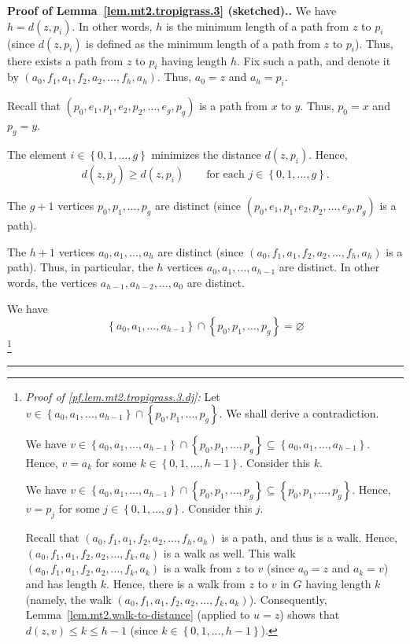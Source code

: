 \documentclass[numbers=enddot,12pt,final,onecolumn,notitlepage]{scrartcl}%
\theoremstyle{definition}
\newenvironment{proof}[1][Proof]{\noindent\textbf{#1.} }{\ \rule{0.5em}{0.5em}}
\newcommand{\set}[1]{\left\{ #1 \right\}}
\newcommand{\tup}[1]{\left( #1 \right)}
\begin{document}
\begin{proof}[Proof of Lemma~\ref{lem.mt2.tropigrass.3} (sketched).]
We have $h = d \tup{z, p_i}$.
In other words, $h$ is the minimum length of a path from $z$
to $p_i$ (since $d \tup{z, p_i}$ is defined as
the minimum length of a path from $z$ to $p_i$).
Thus, there exists a path from $z$ to $p_i$ having length $h$.
Fix such a path, and denote it by
$\tup{a_0, f_1, a_1, f_2, a_2, \ldots, f_h, a_h}$.
Thus, $a_0 = z$ and $a_h = p_i$.

Recall that $\tup{p_0, e_1, p_1, e_2, p_2, \ldots, e_g, p_g}$
is a path from $x$ to $y$.
Thus, $p_0 = x$ and $p_g = y$.

The element $i \in \set{0, 1, \ldots, g}$ minimizes the
distance $d \tup{z, p_i}$. Hence,
\begin{equation}
d \tup{z, p_j} \geq d \tup{z, p_i}
\qquad \text{for each } j \in \set{0, 1, \ldots, g} .
\label{pf.lem.mt2.tropigrass.3.min}
\end{equation}

The $g+1$ vertices $p_0, p_1, \ldots, p_g$ are
distinct
(since $\tup{p_0, e_1, p_1, e_2, p_2, \ldots, e_g, p_g}$ is a
path).

The $h+1$ vertices $a_0, a_1, \ldots, a_h$
are distinct
(since $\tup{a_0, f_1, a_1, f_2, a_2, \ldots, f_h, a_h}$
is a path).
Thus, in particular, the $h$ vertices
$a_0, a_1, \ldots, a_{h-1}$ are distinct.
In other words, the vertices $a_{h-1}, a_{h-2}, \ldots, a_0$ are
distinct.

We have
\begin{equation}
\set{a_0, a_1, \ldots, a_{h-1}} \cap \set{p_0, p_1, \ldots, p_g}
= \varnothing
\label{pf.lem.mt2.tropigrass.3.dj}
\end{equation}
\footnote{\textit{Proof of \eqref{pf.lem.mt2.tropigrass.3.dj}:}
    Let $v \in
    \set{a_0, a_1, \ldots, a_{h-1}} \cap \set{p_0, p_1, \ldots, p_g}$.
    We shall derive a contradiction.

    We have
    $v \in
    \set{a_0, a_1, \ldots, a_{h-1}} \cap \set{p_0, p_1, \ldots, p_g}
    \subseteq \set{a_0, a_1, \ldots, a_{h-1}}$. Hence,
    $v = a_k$ for some $k \in \set{0, 1, \ldots, h-1}$. Consider this
    $k$.

    We have $v \in
    \set{a_0, a_1, \ldots, a_{h-1}} \cap \set{p_0, p_1, \ldots, p_g}
    \subseteq \set{p_0, p_1, \ldots, p_g}$. Hence,
    $v = p_j$ for some $j \in \set{0, 1, \ldots, g}$. Consider this
    $j$. 

    Recall that $\tup{a_0, f_1, a_1, f_2, a_2, \ldots, f_h, a_h}$
    is a path, and thus is a walk. Hence,
    $\tup{a_0, f_1, a_1, f_2, a_2, \ldots, f_k, a_k}$
    is a walk as well. This walk
    $\tup{a_0, f_1, a_1, f_2, a_2, \ldots, f_k, a_k}$
    is a walk from $z$ to $v$ (since
    $a_0 = z$ and $a_k = v$) and has length $k$.
    Hence, there is a walk from $z$ to $v$ in $G$ having length
    $k$ (namely, the walk
    $\tup{a_0, f_1, a_1, f_2, a_2, \ldots, f_k, a_k}$).
    Consequently, Lemma~\ref{lem.mt2.walk-to-distance}
    (applied to $u = z$) shows that
    $d \tup{z, v} \leq k \leq h-1$
    (since $k \in \set{0, 1, \ldots, h-1}$).

}
\end{proof}
\end{document}
